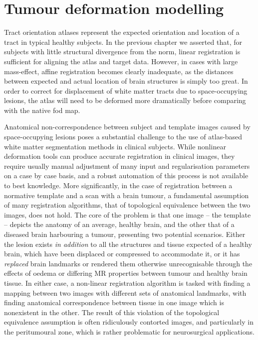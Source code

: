 \section{Tumour deformation modelling}
\label{chapterlabel3}

Tract orientation atlases represent the expected orientation and location of a tract in typical healthy subjects.
In the previous chapter we asserted that, for subjects with little structural divergence from the norm, linear registration is sufficient for aligning the atlas and target data.
However, in cases with large mass-effect, affine registration becomes clearly inadequate, as the distances between expected and actual location of brain structures is simply too great.
In order to correct for displacement of white matter tracts due to space-occupying lesions, the atlas will need to be deformed more dramatically before comparing with the native \gls{fod} map.

Anatomical non-correspondence between subject and template images caused by space-occupying lesions poses a substantial challenge to the use of atlas-based white matter segmentation methods in clinical subjects.
While nonlinear deformation tools can produce accurate registration in clinical images, they require usually manual adjustment of many input and regularisation parameters on a case by case basis, and a robust automation of this process is not available to best knowledge.
More significantly, in the case of registration between a normative template and a scan with a brain tumour, a fundamental assumption of many registration algorithms, that of topological equivalence between the two images, does not hold.\autocite{Zacharaki2009}
The core of the problem is that one image -- the template -- depicts the anatomy of an average, healthy brain, and the other that of a diseased brain harbouring a tumour, presenting two potential scenarios.
Either the lesion exists \textit{in addition} to all the structures and tissue expected of a healthy brain, which have been displaced or compressed to accommodate it, or it has \textit{replaced} brain landmarks or rendered them otherwise unrecognisable through the effects of oedema or differing MR properties between tumour and healthy brain tissue.
In either case, a non-linear registration algorithm is tasked with finding a mapping between two images with different sets of anatomical landmarks, with finding anatomical correspondence between tissue in one image which is nonexistent in the other.
The result of this violation of the topological equivalence assumption is often ridiculously contorted images, and particularly in the peritumoural zone, which is rather problematic for neurosurgical applications.

